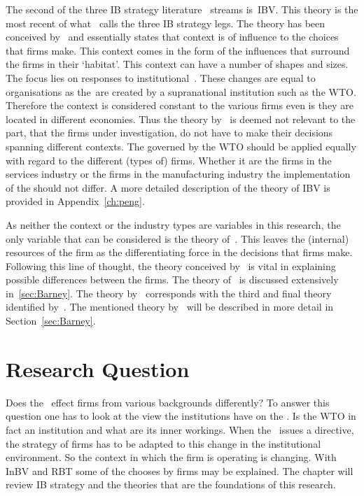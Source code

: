 The second of the three IB strategy literature~\cite{Peng:2009vt} streams is~\gls{IBV}. 
This theory is the most recent of what~\cite{Peng:2009vt} calls the three IB strategy legs.
The theory has been conceived by~\cite{Peng:2002ef} and essentially states that context is of influence to the choices that firms make.
This context comes in the form of the influences that surround the firms in their `habitat'.
This context can have a number of shapes and sizes.
The focus lies on responses to institutional~\rr.
These changes are equal to organisations as the~\rr are created by a supranational institution such as the WTO\@.
Therefore the context is considered constant to the various firms even is they are located in different economies.
Thus the theory by~\cite{Peng:2008b} is deemed not relevant to the part, that the firms under investigation, do not have to make their decisions spanning different contexts.
The \rr governed by the WTO should be applied equally with regard to the different (types of) firms.
Whether it are the firms in the services industry or the firms in the manufacturing industry the implementation of the \rr should not differ. 
A more detailed description of the theory of \gls{IBV} is provided in Appendix~\ref{ch:peng}.

As neither the context or the industry types are variables in this research, the only variable that can be considered is the theory of~\cite{Barney:1991ur}.
This leaves the (internal) resources of the firm as the differentiating force in the decisions that firms make. 
Following this line of thought, the theory conceived by~\cite{Barney:1991ur} is vital in explaining possible differences between the firms.
The theory of~\cite{Barney:1991ur} is discussed extensively in~\ref{sec:Barney}.
The theory by~\cite{Barney:1991ur} corresponds with the third and final theory identified by~\citep{Peng:2009vt}.
The mentioned theory by~\cite{Barney:1991ur} will be described in more detail in Section~\ref{sec:Barney}.



\section{Research Question}

Does the \wto~effect firms from various backgrounds differently? 
To answer this question one has to look at the view the institutions have on the \wto. 
Is the WTO in fact an institution and what are its inner workings. 
When the \wto~issues a directive, the strategy of firms has to be adapted to this change in the institutional environment.
So the context in which the firm is operating is changing. 
With \gls{InBV} and \gls{RBT} %
some of the chooses by firms may be explained. 
The \litreview chapter will review \gls{IB} strategy and the theories that are the foundations of this research.

